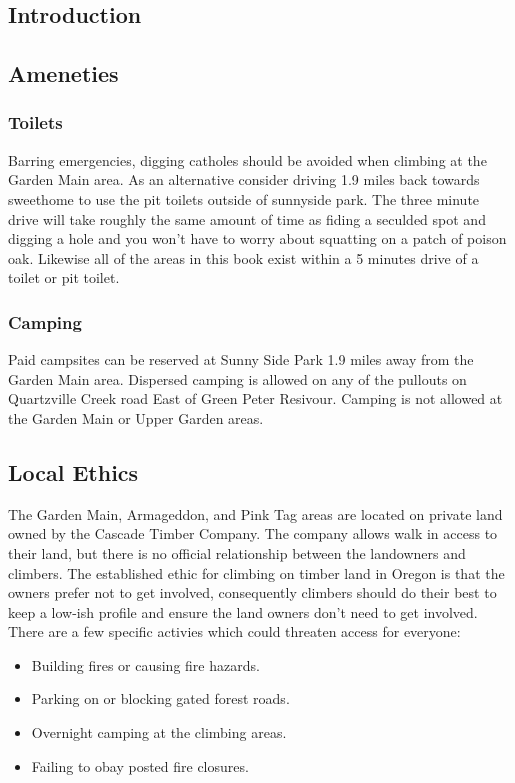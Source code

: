 \begin{multicols*}{2}
\chapter{Introduction}
\lhead{\textcolor{\chapterColor}{\rule[-2pt]{\textwidth}{15pt}}}
\section{Ameneties}
\subsection*{Toilets}
Barring emergencies, digging catholes should be avoided when climbing at the Garden Main area. As an alternative consider driving 1.9 miles back towards sweethome to use the pit toilets outside of sunnyside park. The three minute drive will take roughly the same amount of time as fiding a seculded spot and digging a hole and you won't have to worry about squatting on a patch of poison oak. Likewise all of the areas in this book exist within a 5 minutes drive of a toilet or pit toilet. 
\subsection*{Camping}
Paid campsites can be reserved at Sunny Side Park 1.9 miles away from the Garden Main area. Dispersed camping is allowed on any of the pullouts on Quartzville Creek road East of Green Peter Resivour. Camping is not allowed at the Garden Main or Upper Garden areas.
\section{Local Ethics}
The Garden Main, Armageddon, and Pink Tag areas are located on private land owned by the Cascade Timber Company. The company allows walk in access to their land, but there is no official relationship between the landowners and climbers. The established ethic for climbing on timber land in Oregon is that the owners prefer not to get involved, consequently climbers should do their best to keep a low-ish profile and ensure the land owners don't need to get involved. There are a few specific activies which could threaten access for everyone:\\
\begin{itemize}
\item Building fires or causing fire hazards.\\
\item Parking on or blocking gated forest roads.\\
\item Overnight camping at the climbing areas.\\
\item Failing to obay posted fire closures.\\
\end{itemize}

\end{multicols*}
